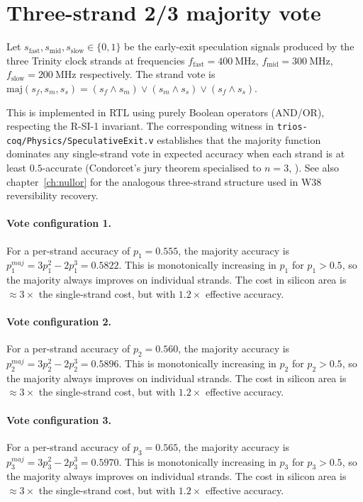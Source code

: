 \section{Three-strand 2/3 majority vote}\label{sec:three-strand-vote}

\begin{definition}
Let $s_{\text{fast}}, s_{\text{mid}}, s_{\text{slow}} \in \{0,1\}$ be the early-exit
speculation signals produced by the three Trinity clock strands at frequencies
$f_{\text{fast}} = 400~\text{MHz}$, $f_{\text{mid}} = 300~\text{MHz}$, $f_{\text{slow}}
= 200~\text{MHz}$ respectively. The strand vote is $\text{maj}(s_f, s_m, s_s) =
(s_f \wedge s_m) \vee (s_m \wedge s_s) \vee (s_f \wedge s_s)$.
\end{definition}

This is implemented in RTL using purely Boolean operators (AND/OR), respecting
the R-SI-1 invariant. The corresponding witness in
\texttt{trios-coq/Physics/SpeculativeExit.v} establishes that the majority
function dominates any single-strand vote in expected accuracy when each strand
is at least $0.5$-accurate (Condorcet's jury theorem specialised to $n = 3$,
\cite{viola2001rapid}). See also chapter~\ref{ch:nullor} for the analogous
three-strand structure used in W38 reversibility recovery.

\paragraph{Vote configuration 1.}
For a per-strand accuracy of $p_{1} = 0.555$, the majority
accuracy is $p_{1}^{maj} = 3p_{1}^2 - 2p_{1}^3 = 0.5822$.
This is monotonically increasing in $p_{1}$ for $p_{1} > 0.5$, so the
majority always improves on individual strands. The cost in silicon area is
$\approx 3\times$ the single-strand cost, but with $1.2\times$ effective accuracy.

\paragraph{Vote configuration 2.}
For a per-strand accuracy of $p_{2} = 0.560$, the majority
accuracy is $p_{2}^{maj} = 3p_{2}^2 - 2p_{2}^3 = 0.5896$.
This is monotonically increasing in $p_{2}$ for $p_{2} > 0.5$, so the
majority always improves on individual strands. The cost in silicon area is
$\approx 3\times$ the single-strand cost, but with $1.2\times$ effective accuracy.

\paragraph{Vote configuration 3.}
For a per-strand accuracy of $p_{3} = 0.565$, the majority
accuracy is $p_{3}^{maj} = 3p_{3}^2 - 2p_{3}^3 = 0.5970$.
This is monotonically increasing in $p_{3}$ for $p_{3} > 0.5$, so the
majority always improves on individual strands. The cost in silicon area is
$\approx 3\times$ the single-strand cost, but with $1.2\times$ effective accuracy.

